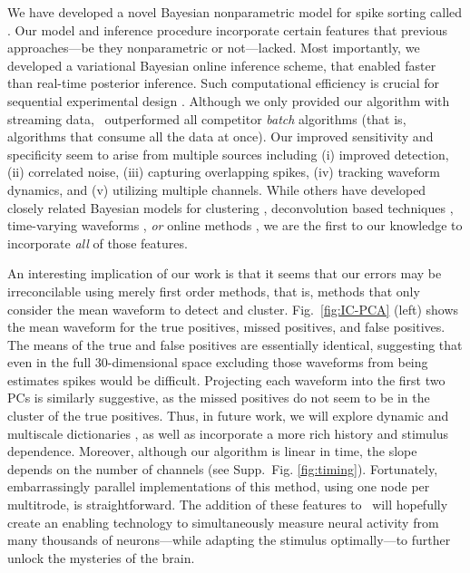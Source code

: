 
We have developed a novel Bayesian nonparametric model for spike sorting called \smug.  Our model and inference procedure incorporate certain features that previous approaches---be they nonparametric or not---lacked.  Most importantly, we developed a variational Bayesian online inference scheme, that enabled faster than real-time posterior inference.  Such computational efficiency is crucial for sequential experimental design \cite{}.  Although we only provided our algorithm with streaming data, \smug\ outperformed all competitor \emph{batch} algorithms (that is, algorithms that consume all the data at once). Our improved sensitivity and specificity seem to arise from multiple sources including (i) improved detection, (ii) correlated noise, (iii) capturing overlapping spikes, (iv) tracking waveform dynamics, and (v) utilizing multiple channels.  While others have developed closely related Bayesian models for clustering \cite{WoodBla2008,wood2009}, deconvolution based techniques \cite{Pillow2013}, time-varying waveforms \cite{calabrese2011kalman},  \emph{or} online methods \cite{OSORT, Franke2010}, we are the first to our knowledge to incorporate \emph{all} of those features.

An interesting implication of our work is that it seems that our errors may be irreconcilable using merely first order methods, that is, methods that only consider the mean waveform to detect and cluster.  Fig.\ \ref{fig:IC-PCA} (left) shows the mean waveform for the true positives, missed positives, and false positives.  The means of the true and false positives are essentially identical, suggesting that even in the full 30-dimensional space excluding those waveforms from being estimates spikes would be difficult.  Projecting each waveform into the first two PCs is similarly suggestive, as the missed positives do not seem to be in the cluster of the true positives. Thus, in future work, we will explore dynamic and multiscale dictionaries \cite{ChenMaggioni12}, as well as incorporate a more rich history and stimulus dependence.  
Moreover, although our algorithm is linear in time, the slope depends on the number of channels (see Supp.\ Fig. \ref{fig:timing}).  Fortunately, embarrassingly parallel implementations of this method, using one node per multitrode, is straightforward.  The addition of these features to \smug\ will hopefully create an enabling technology to  simultaneously measure neural activity from many thousands of neurons---while adapting the stimulus optimally---to further unlock the mysteries of the brain.



